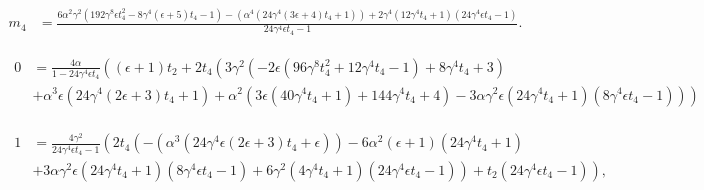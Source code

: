 \documentclass[10pt,a4paper]{amsart}
\begin{document}
 \begin{align}\label{eq:m4 one-cut}
 m_{4} &=\frac{6 \alpha ^2 \gamma ^2 \left(192 \gamma ^8 \epsilon t_{4}^2-8 \gamma ^4 (\epsilon+5)
 t_{4}-1\right)-\left(\alpha ^4 \left(24 \gamma ^4 (3 \epsilon+4) t_{4}+1\right)\right)+2
 \gamma ^4 \left(12 \gamma ^4 t_{4}+1\right) \left(24 \gamma ^4 \epsilon
 t_{4}-1\right)}{24 \gamma ^4 \epsilon t_{4}-1}.
	\end{align}

 \begin{align}\label{eq:1-cut condition 2}
 \begin{split}
		0&=\frac{4 \alpha}{1-24 \gamma ^4 \epsilon t_{4}} \left((\epsilon+1) t_{2}+2 t_{4} \left(3 \gamma ^2 \left(-2 \epsilon
 \left(96 \gamma ^8 t_{4}^2+12 \gamma ^4 t_{4}-1\right)+8 \gamma ^4
 t_{4}+3\right) \right.\right.\\
 &\left.\left.+\alpha ^3 \epsilon \left(24 \gamma ^4 (2 \epsilon+3)
 t_{4}+1\right)+\alpha ^2 \left(3 \epsilon \left(40 \gamma ^4 t_{4}+1\right)+144 \gamma
 ^4 t_{4}+4\right)-3 \alpha \gamma ^2 \epsilon \left(24 \gamma ^4 t_{4}+1\right) \left(8
 \gamma ^4 \epsilon t_{4}-1\right)\right)\right)
 \end{split}
	\end{align}

	\begin{align}\label{eq:1-cut condition 1}
 \begin{split}
		1&= \frac{4 \gamma^2}{24 \gamma ^4 \epsilon
 t_{4}-1} \left(2 t_{4} \left(-\left(\alpha ^3 \left(24 \gamma ^4 \epsilon (2
 \epsilon+3) t_{4}+\epsilon\right)\right)-6 \alpha ^2 (\epsilon+1) \left(24 \gamma ^4
 t_{4}+1\right)\right. \right.\\
 &\left. \left.+3 \alpha \gamma ^2 \epsilon \left(24 \gamma ^4 t_{4}+1\right) \left(8
 \gamma ^4 \epsilon t_{4}-1\right)+6 \gamma ^2 \left(4 \gamma ^4 t_{4}+1\right) \left(24
 \gamma ^4 \epsilon t_{4}-1\right)\right)+t_{2}(24 \gamma ^4 \epsilon
 t_{4}-1)\right),
 \end{split}
	\end{align}
\end{document}

